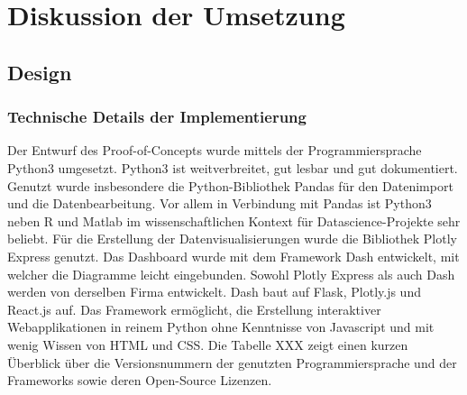 \chapter{Diskussion der Umsetzung}
\label{chap:five}
\section{Design}
    \subsection{Technische Details der Implementierung}
    Der Entwurf des Proof-of-Concepts wurde mittels der Programmiersprache Python3 umgesetzt. Python3 ist weitverbreitet, gut lesbar und gut dokumentiert.
    Genutzt wurde insbesondere die Python-Bibliothek Pandas für den Datenimport und die Datenbearbeitung. Vor allem in Verbindung mit Pandas ist Python3 neben R und Matlab
    im wissenschaftlichen Kontext für Datascience-Projekte sehr beliebt. Für die Erstellung der Datenvisualisierungen wurde die Bibliothek Plotly Express genutzt. Das Dashboard      
    wurde mit dem Framework Dash entwickelt, mit welcher die Diagramme leicht eingebunden. Sowohl Plotly Express als auch Dash werden von derselben Firma entwickelt. Dash baut 
    auf Flask, Plotly.js und React.js auf. Das Framework ermöglicht, die Erstellung interaktiver Webapplikationen in reinem Python ohne Kenntnisse von Javascript und mit wenig
    Wissen von HTML und CSS. Die Tabelle XXX zeigt einen kurzen Überblick über die Versionsnummern der genutzten Programmiersprache und der Frameworks sowie deren Open-Source
    Lizenzen.
    
